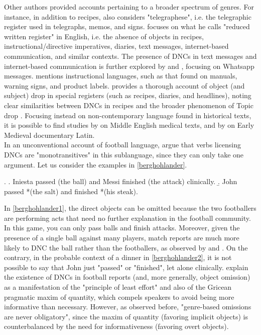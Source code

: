 Other authors provided accounts pertaining to a broader spectrum of genres. For instance, in addition to recipes, \textcite{Cote1996} also considers "telegraphese", i.e. the telegraphic register used in telegraphs, memos, and signs. \textcite{Weir2017} focuses on what he calls "reduced written register" in English, i.e. the absence of objects in recipes, instructional/directive imperatives, diaries, text messages, internet-based communication, and similar contexts. The presence of DNCs in text messages and internet-based communication is further explored by \textcite{StarkMeier2017} and \textcite{Stuntebeck2018}, focusing on Whatsapp messages. \textcite[304]{Liu2008} mentions instructional languages, such as that found on manuals, warning signs, and product labels. \textcite{Paesani2006} provides a thorough account of object (and subject) drop in special registers (such as recipes, diaries, and headlines), noting clear similarities between DNCs in recipes and the broader phenomenon of Topic drop \parencite[165]{Paesani2006}. Focusing instead on non-contemporary language found in historical texts, it is possible to find studies by \textcite{Almeida2009} on Middle English medical texts, and by \textcite{Korkiakangas2018} on Early Medieval documentary Latin.\\
In an unconventional account of football language, \textcite{BerghOhlander2016} argue that verbs licensing DNCs are "monotransitives" \parencite[54]{quirk1985grammar} in this sublanguage, since they can only take one argument. Let us consider the examples in \ref{berghohlander}.

\ex. \label{berghohlander} \a. \label{berghohlander1} Iniesta passed (the ball) and Messi finished (the attack) clinically.
\b. \label{berghohlander2} John passed *(the salt) and finished *(his steak).

In \ref{berghohlander1}, the direct objects can be omitted because the two footballers are performing acts that need no further explanation in the football community. In this game, you can only pass balls and finish attacks. Moreover, given the presence of a single ball against many players, match reports are much more likely to DNC the ball rather than the footballers, as observed by \textcite[167]{RuppenhoferMichaelis2010} and \textcite{ebeling2021score}. On the contrary, in the probable context of a dinner in \ref{berghohlander2}, it is not possible to say that John just "passed" or "finished", let alone clinically. \textcite[22]{BerghOhlander2016} explain the existence of DNCs in football reports (and, more generally, object omission) as a manifestation of the "principle of least effort" \parencite{zipf1949leasteffort} and also of the Gricean pragmatic maxim of quantity, which compels speakers to avoid being more informative than necessary. However, as \textcite[166]{RuppenhoferMichaelis2010} observed before, "genre-based omissions are never obligatory", since the maxim of quantity (favoring implicit objects) is counterbalanced by the need for informativeness (favoring overt objects).


